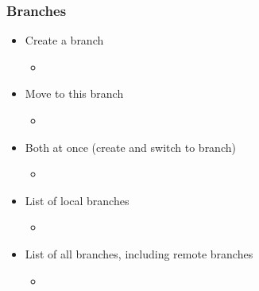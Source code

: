 \begin{frame}
  \frametitle{Branches}
  \begin{itemize}
  \item Create a branch
    \begin{itemize}
    \item {}
    \end{itemize}
  \item Move to this branch
    \begin{itemize}
    \item {}
    \end{itemize}
  \item Both at once (create and switch to branch)
    \begin{itemize}
    \item {}
    \end{itemize}
  \item List of local branches
    \begin{itemize}
    \item {}
    \end{itemize}
  \item List of all branches, including remote branches
    \begin{itemize}
    \item {}
    \end{itemize}
  \end{itemize}
\end{frame}

